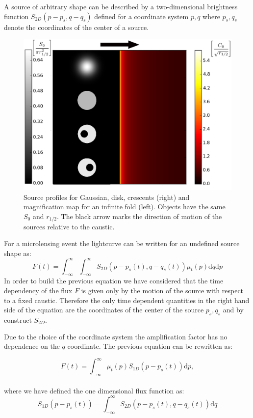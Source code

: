 \documentclass[usenatbib]{mn2e}
\begin{document}
A source of arbitrary shape can be described by a two-dimensional brightness function $S_{2D}(p - p_s, q - q_s)$ defined for a coordinate system $p,q$ where $p_s, q_s$ denote the coordinates of the center of a source.

\begin{figure}
\includegraphics[width = .49\textwidth]{figures/infinite_fold_ar.eps}
\caption{\label{fig:infinite_fold} Source profiles for Gaussian, disk,
  crescents (right) and magnification map for an infinite fold
  (left). Objects have the same $S_{0}$ and $r_{1/2}$. The black arrow marks the direction of motion of the
sources relative to the caustic.}
\end{figure}

For a microlensing event the lightcurve can be written for an
undefined source shape as:
\begin{equation}
 F(t) = \int_{-\infty}^\infty \int_{-\infty}^\infty S_{2D}(p-p_s(t), q-q_s(t)) \mu_t(p) \mathrm{d}q \mathrm{d}p
 \label{eqn:ft2d}
\end{equation}
In order to build the previous equation we have considered that the
time dependency of the flux $F$ is given only by the motion of the
source with respect to a fixed caustic. Therefore the only time
dependent quantities in the right hand side of the equation are the
coordinates of the center of the source $p_s,q_s$ and by construct
$S_{2D}$.

Due to the choice of the coordinate system the amplification factor has no dependence on the $q$ coordinate. The previous equation can be rewritten as:

\begin{equation}
 F(t) 
= \int_{-\infty}^\infty  \mu_t(p) S_{1D}\left(p-p_s(t)\right) \mathrm{d}p,
\label{eqn:ft}
\end{equation}
\\
where we have defined the one dimensional flux function as:
\begin{equation}
 S_{1D}(p-p_s(t)) = \int_{-\infty}^\infty S_{2D}(p-p_s(t), q-q_s(t)) \mathrm{d}q
\end{equation}
\end{document}
